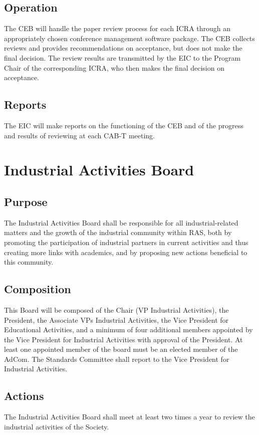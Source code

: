 \documentclass[10pt]{article}
\begin{document}
\subsection{Operation}

The CEB will handle the paper review process for each ICRA through an appropriately chosen conference management software package. The CEB collects reviews and provides recommendations on acceptance, but does not make the final decision. The review results are transmitted by the EIC to the Program Chair of the corresponding ICRA, who then makes the final decision on acceptance. 

\subsection{Reports}

The EIC will make reports on the functioning of the CEB and of the progress and results of reviewing at each CAB-T meeting.


\section{Industrial Activities Board}
\label{IAB}
\subsection{Purpose}

The Industrial Activities Board shall be responsible for all industrial-related matters and the growth of the industrial community within RAS, both by promoting the participation of industrial partners in current activities and thus creating more links with academics, and by proposing new actions beneficial to this community.

\subsection{Composition}
This Board will be composed of the Chair (VP Industrial Activities), the President, the Associate VPs Industrial Activities, the Vice President for Educational Activities, and a minimum of four additional members appointed by the Vice President for Industrial Activities with approval of the President. At least one appointed member of the board must be an elected member of the AdCom. The Standards Committee shall report to the Vice President for Industrial Activities.

\subsection{Actions}
The Industrial Activities Board shall meet at least two times a year to review the industrial activities of the Society.
\end{document}
